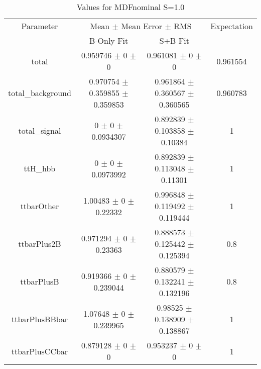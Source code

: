 \begin{table}
\centering
\caption{Values for MDFnominal S=1.0}
\begin{tabular}{cccc}
\toprule
Parameter & \multicolumn{2}{c}{Mean $\pm$ Mean Error $\pm$ RMS} & Expectation\\
 & B-Only Fit & S+B Fit & \\
\midrule
total & \num{0.959746} $\pm$ \num{0} $\pm$ \num{0} & \num{0.961081} $\pm$ \num{0} $\pm$ \num{0} & \num{0.961554}\\
total\_background & \num{0.970754} $\pm$ \num{0.359855} $\pm$ \num{0.359853} & \num{0.961864} $\pm$ \num{0.360567} $\pm$ \num{0.360565} & \num{0.960783}\\
total\_signal & \num{0} $\pm$ \num{0} $\pm$ \num{0.0934307} & \num{0.892839} $\pm$ \num{0.103858} $\pm$ \num{0.10384} & \num{1}\\
ttH\_hbb & \num{0} $\pm$ \num{0} $\pm$ \num{0.0973992} & \num{0.892839} $\pm$ \num{0.113048} $\pm$ \num{0.11301} & \num{1}\\
ttbarOther & \num{1.00483} $\pm$ \num{0} $\pm$ \num{0.22332} & \num{0.996848} $\pm$ \num{0.119492} $\pm$ \num{0.119444} & \num{1}\\
ttbarPlus2B & \num{0.971294} $\pm$ \num{0} $\pm$ \num{0.23363} & \num{0.888573} $\pm$ \num{0.125442} $\pm$ \num{0.125394} & \num{0.8}\\
ttbarPlusB & \num{0.919366} $\pm$ \num{0} $\pm$ \num{0.239044} & \num{0.880579} $\pm$ \num{0.132241} $\pm$ \num{0.132196} & \num{0.8}\\
ttbarPlusBBbar & \num{1.07648} $\pm$ \num{0} $\pm$ \num{0.239965} & \num{0.98525} $\pm$ \num{0.138909} $\pm$ \num{0.138867} & \num{1}\\
ttbarPlusCCbar & \num{0.879128} $\pm$ \num{0} $\pm$ \num{0} & \num{0.953237} $\pm$ \num{0} $\pm$ \num{0} & \num{1}\\
\bottomrule
\end{tabular}
\end{table}